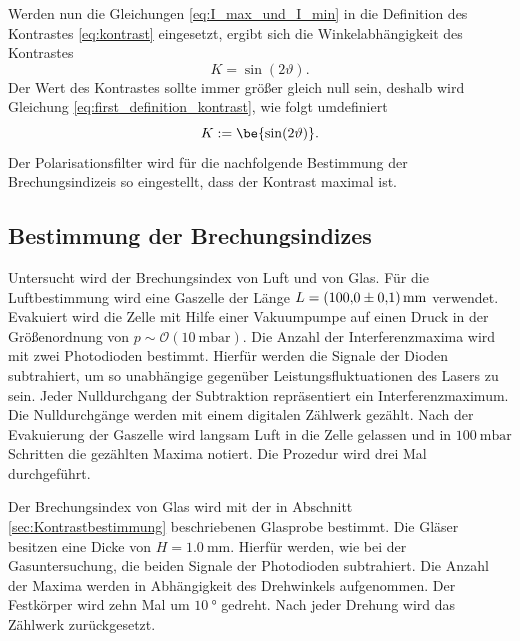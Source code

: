 Werden nun die Gleichungen \eqref{eq:I_max_und_I_min} in die Definition des Kontrastes \eqref{eq:kontrast}
eingesetzt, ergibt sich die Winkelabhängigkeit des Kontrastes
\begin{equation}
  \label{eq:first_definition_kontrast}
  K=\sin(2\vartheta).
\end{equation}
Der Wert des Kontrastes sollte immer größer gleich null sein, deshalb wird Gleichung \eqref{eq:first_definition_kontrast},
wie folgt umdefiniert
\begin{equation}
  \label{eq:definition_dontrast}
  K:=\be{\sin(2\vartheta)}.
\end{equation}
Der Polarisationsfilter wird für die nachfolgende Bestimmung der Brechungsindizeis
so eingestellt, dass der Kontrast maximal ist.
\subsection{Bestimmung der Brechungsindizes}
Untersucht wird der Brechungsindex von Luft und von Glas.
Für die Luftbestimmung wird eine Gaszelle der Länge $L=\SI{100\pm0.1}{\milli\meter}$
verwendet. Evakuiert wird die Zelle mit Hilfe einer Vakuumpumpe auf einen
Druck in der Größenordnung von $p\sim\mathcal{O}(\SI{10}{\milli\bar})$.
Die Anzahl der Interferenzmaxima wird mit zwei Photodioden bestimmt.
Hierfür werden die Signale der Dioden subtrahiert, um so unabhängige gegenüber
Leistungsfluktuationen des Lasers zu sein. Jeder Nulldurchgang der Subtraktion
repräsentiert ein Interferenzmaximum. Die Nulldurchgänge werden mit einem digitalen
Zählwerk gezählt. Nach der Evakuierung der Gaszelle wird langsam Luft in die Zelle
gelassen und in $\SI{100}{\milli\bar}$ Schritten die gezählten Maxima notiert. Die Prozedur wird
drei Mal durchgeführt.

Der Brechungsindex von Glas wird mit der in Abschnitt \ref{sec:Kontrastbestimmung}
beschriebenen Glasprobe bestimmt. Die Gläser besitzen eine Dicke von $H=\SI{1.0}{\milli\meter}$.
Hierfür werden, wie bei der Gasuntersuchung,
die beiden Signale der Photodioden subtrahiert. Die Anzahl der Maxima
werden in Abhängigkeit des Drehwinkels aufgenommen.
Der Festkörper wird zehn Mal um
$\SI{10}{\degree}$ gedreht. Nach jeder Drehung wird das Zählwerk zurückgesetzt.
